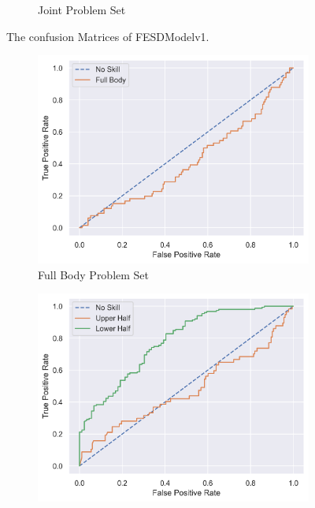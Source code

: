 \begin{figure}[!htbp]
\begin{subfigure}[b]{0.4\linewidth}
      \caption[]{Joint Problem Set}
      \label{fig:jt_conf_v1}
  \end{subfigure}
  \caption[Confusion Matrices of FESDModelv1]{The confusion Matrices of FESDModelv1.}
  \label{fig:conf_v1}
\end{figure}

\begin{figure}[htbp]
  \centering
  \begin{subfigure}[b]{0.4\linewidth}
      \centering
      \includegraphics[width=\textwidth]{figures/Results/v1/roc/fb.png}
      \caption[]{Full Body Problem Set}
      \label{fig:fb_roc_v1}
  \end{subfigure}
  \hfill
  \begin{subfigure}[b]{0.4\linewidth}
      \centering
      \includegraphics[width=\textwidth]{figures/Results/v1/roc/hb.png}

\end{subfigure}
\end{figure}
